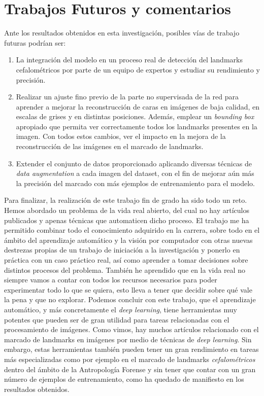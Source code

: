 \section{Trabajos Futuros y comentarios}

\noindent Ante los resultados obtenidos en esta investigación, posibles vías de trabajo futuras podrían ser:

\begin{enumerate}
    \item La integración del modelo en un proceso real de detección del landmarks cefalométricos por parte de un equipo de expertos y estudiar su rendimiento y precisión.
    \item Realizar un ajuste fino previo de la parte no supervisada de la red para aprender a mejorar la reconstrucción de caras en imágenes de baja calidad, en escalas de grises y en distintas posiciones. Además, emplear un \textit{bounding box} apropiado que permita ver correctamente todos los landmarks presentes en la imagen. Con todos estos cambios, ver el impacto en la mejora de la reconstrucción de las imágenes en el marcado de landmarks.
    \item Extender el conjunto de datos proporcionado aplicando diversas técnicas de \textit{data augmentation} a cada imagen del dataset, con el fin de mejorar aún más la precisión del marcado con más ejemplos de entrenamiento para el modelo.
\end{enumerate}

\medskip

\noindent Para finalizar, la realización de este trabajo fin de grado ha sido todo un reto. Hemos abordado un problema de la vida real abierto, del cual no hay artículos publicados y apenas técnicas que automaticen dicho proceso. El trabajo me ha permitido combinar todo el conocimiento adquirido en la carrera, sobre todo en el ámbito del aprendizaje automático y la visión por computador con otras nuevas destrezas propias de un trabajo de iniciación a la investigación y ponerlo en práctica con un caso práctico real, así como aprender a tomar decisiones sobre distintos procesos del problema. También he aprendido que en la vida real no siempre vamos a contar con todos los recursos necesarios para poder experimentar todo lo que se quiera, esto lleva a tener que decidir sobre qué vale la pena y que no explorar. Podemos concluir con este trabajo, que el aprendizaje automático, y más concretamente el \textit{deep learning}, tiene herramientas muy potentes que pueden ser de gran utilidad para tareas relacionadas con el procesamiento de imágenes. Como vimos, hay muchos artículos relacionado con el marcado de landmarks en imágenes por medio de técnicas de \textit{deep learning}. Sin embargo, estas herramientas también pueden tener un gran rendimiento en tareas más especializadas como por ejemplo en el marcado de landmarks \textit{cefalométricos} dentro del ámbito de la Antropología Forense y sin tener que contar con un gran número de ejemplos de entrenamiento, como ha quedado de manifiesto en los resultados obtenidos.


\endinput

